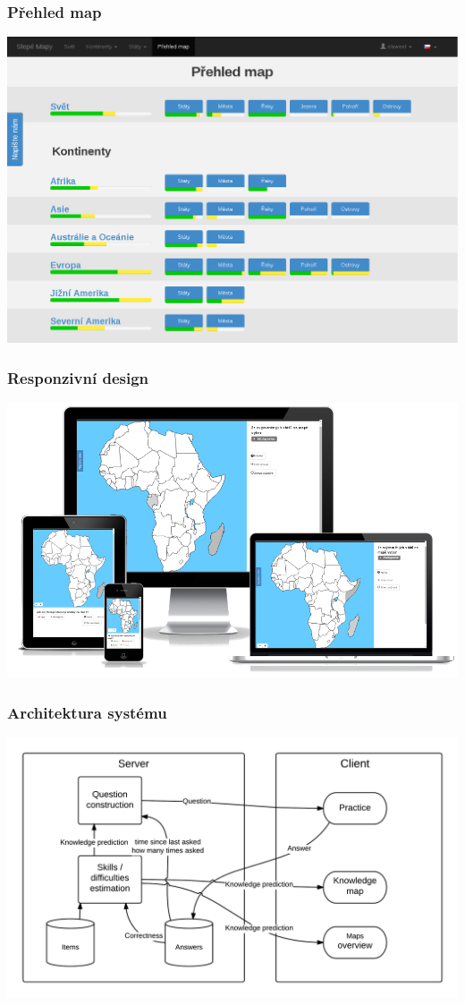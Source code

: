 \documentclass[xcolor=svgnames]{beamer}
\begin{document}
\begin{frame}
	\frametitle{Přehled map}
   \includegraphics[width=\textwidth]{img/overview.png}
\end{frame}
\begin{frame}
	\frametitle{Responzivní design}
   \includegraphics[width=\textwidth]{img/responsive.png}
\end{frame}
\begin{frame}
	\frametitle{Architektura systému}
   \includegraphics[width=\textwidth]{img/architecture.png}
\end{frame}
\end{document}
